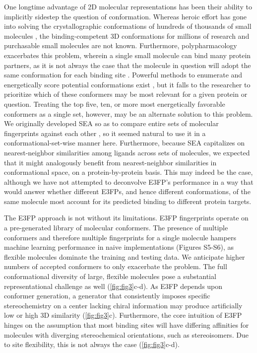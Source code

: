 \documentclass[../main.tex]{subfiles}
\begin{document}
\begin{refsection}
One longtime advantage of 2D molecular representations has been their ability to implicitly sidestep the question of conformation.
Whereas heroic effort has gone into solving the crystallographic conformations of hundreds of thousands of small molecules \cite{allen_2002,kellenberger_2006}, the binding-competent 3D conformations for millions of research  \cite{bento_2014} and purchasable \cite{sterling_2015} small molecules are not known.
Furthermore, polypharmacology exacerbates this problem, wherein a single small molecule can bind many protein partners, as it is not always the case that the molecule in question will adopt the same conformation for each binding site \cite{nicholls_2010}.
Powerful methods to enumerate and energetically score potential conformations exist \cite{halgren_1996,gonzlez_2011,rappe_1992}, but it falls to the researcher to prioritize which of these conformers may be most relevant for a given protein or question.
Treating the top five, ten, or more most energetically favorable conformers as a single set, however, may be an alternate solution to this problem.
We originally developed SEA so as to compare entire sets of molecular fingerprints against each other  \cite{keiser_2007}, so it seemed natural to use it in a conformational-set-wise manner here.
Furthermore, because SEA capitalizes on nearest-neighbor similarities among ligands across sets of molecules, we expected that it might analogously benefit from nearest-neighbor similarities in conformational space, on a protein-by-protein basis.
This may indeed be the case, although we have not attempted to deconvolve E3FP's performance in a way that would answer whether different E3FPs, and hence different conformations, of the same molecule most account for its predicted binding to different protein targets.

The E3FP approach is not without its limitations.
E3FP fingerprints operate on a pre-generated library of molecular conformers.
The presence of multiple conformers and therefore multiple fingerprints for a single molecule hampers machine learning performance in naive implementations  (Figures S5-S6), as flexible molecules dominate the training and testing data.
We anticipate higher numbers of accepted conformers to only exacerbate the problem.
The full conformational diversity of large, flexible molecules pose a substantial representational challenge as well  (\cref{fig:fig3}c-d).
As E3FP depends upon conformer generation, a generator that consistently imposes specific stereochemistry on a center lacking chiral information may produce artificially low or high 3D similarity  (\cref{fig:fig3}c).
Furthermore, the core intuition of E3FP hinges on the assumption that most binding sites will have differing affinities for molecules with diverging stereochemical orientations, such as stereoisomers.
Due to site flexibility, this is not always the case  (\cref{fig:fig3}c-d).


\end{refsection}
\end{document}
